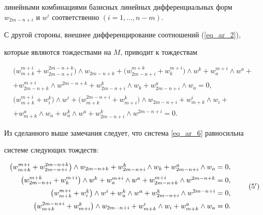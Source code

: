 линейными комбинациями базисных линейных дифференциальных форм $w_{2m-


n+i}$ и $w^i$ соответственно $(i=1,\dotsc, n-m)$.


С другой стороны, внешнее дифференцирование соотношений (\ref{eq_ar_2}),


которые являются тождествами на $M$, приводит к тождествам


\begin{equation}


\label{eq_ar_6}


\begin{array}{c}


\big(w^{m+i}_{m+k}+w^{2m-n+k}_{2m-n+i}\big)\wedge w_{2m-n+k}+


\big(w^{m+k}_{2m-n+i}+w^{m+i}_{k}\big)\wedge w^k+w^{m+i}_a\wedge


w^a+\\[2mm]


+w^{m+i}_{2m-n+k}\wedge w^{2m-n+k}+w^k_{2m-n+i}\wedge w_k


+ w^{a}_{2m-n+i}\wedge w_a=0,\\[3mm]


\big(w^{m+i}_{m+k}+w^{k}_{i}\big)\wedge w^i+


\big(w^{2m-n+i}_{m+k}+w^k_{m+i}\big)\wedge w_{2m-


n+i}+w^{i}_{m+k}\wedge w_i+\\[2mm]


+w^a_{m+k}\wedge w_a+w^k_a\wedge w^a + w^{k}_{2m-n+i}\wedge w^{2m-n+i}=0.


\end{array}


\end{equation}


Из сделанного выше замечания следует, что система \eqref{eq_ar_6} равносильна 


системе следующих тождеств:


\begin{equation}




\begin{array}{r}


\big(w^{m+i}_{m+k}+w^{2m-n+k}_{2m-n+i}\big)\wedge w_{2m-n+k}+


w^{k}_{2m-n+i}\wedge w_{k}+w^a_{2m-n+i}\wedge w_a=0,\\[2mm]


\big(w^{m+k}_{2m-n+i}+w^{m+i}_k\big)\wedge w^k+ w^{m+i}_a\wedge


w^a+w^{m+i}_{2m-n+k}\wedge w^{2m-n+k}=0,\\[2mm]


\big(w_{m+k}^{m+i}+w^k_i\big)\wedge w^i+ w^k_a\wedge w^a+w^k_{2m-


n+i}\wedge w^{2m-n+i}=0,\\[2mm]


\big(w_{m+k}^{2m-n+i}+w^k_{m+i}\big)\wedge w_{2m-n+i}+ w^i_{m+k}\wedge


w_i+w^a_{m+k}\wedge w_a=0.


\end{array}


\tag{5${}'$}


\end{equation}


